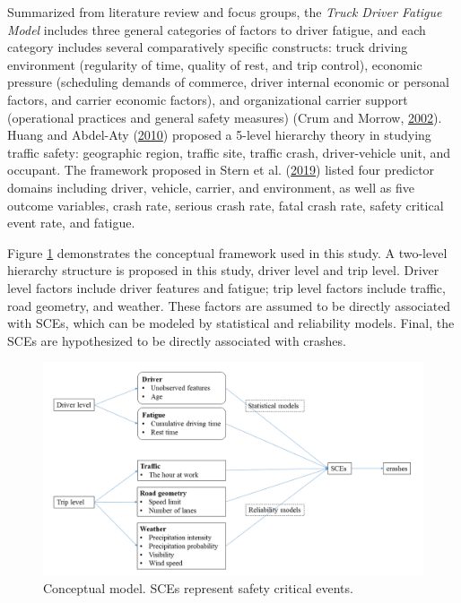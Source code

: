 \documentclass[12pt]{book}
\numberwithin{equation}{chapter}
\begin{document}
Summarized from literature review and focus groups, the \emph{Truck Driver Fatigue Model} includes three general categories of factors to driver fatigue, and each category includes several comparatively specific constructs: truck driving environment (regularity of time, quality of rest, and trip control), economic pressure (scheduling demands of commerce, driver internal economic or personal factors, and carrier economic factors), and organizational carrier support (operational practices and general safety measures) (Crum and Morrow, \protect\hyperlink{ref-crum2002influence}{2002}). Huang and Abdel-Aty (\protect\hyperlink{ref-huang2010multilevel}{2010}) proposed a 5-level hierarchy theory in studying traffic safety: geographic region, traffic site, traffic crash, driver-vehicle unit, and occupant. The framework proposed in Stern et al. (\protect\hyperlink{ref-stern2019data}{2019}) listed four predictor domains including driver, vehicle, carrier, and environment, as well as five outcome variables, crash rate, serious crash rate, fatal crash rate, safety critical event rate, and fatigue.

Figure \ref{fig:conceptmodel} demonstrates the conceptual framework used in this study. A two-level hierarchy structure is proposed in this study, driver level and trip level. Driver level factors include driver features and fatigue; trip level factors include traffic, road geometry, and weather. These factors are assumed to be directly associated with SCEs, which can be modeled by statistical and reliability models. Final, the SCEs are hypothesized to be directly associated with crashes.

\begin{figure}[ht]

{\centering \includegraphics[width=\linewidth]{figs/conceptual_model} 

}

\caption{Conceptual model. SCEs represent safety critical events.}\label{fig:conceptmodel}
\end{figure}
\end{document}
